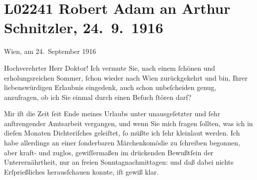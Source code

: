

\section[Robert Adam an Arthur Schnitzler, 24. 9. 1916]{L02241 Robert Adam an Arthur Schnitzler, 24. 9. 1916}
\nopagebreak{}
\rehead{ }\normalsize\beginnumbering{}
\toendnotes[C]{\smallbreak\pagebreak[2]}
\toendnotes[C]{\smallbreak}
\toendnotes[C]{\smallbreak}
\pstart
           \raggedleft{}{\pb}Wien, am 24. September 1916\pend
           
\pstart{}Hochverehrter Herr Doktor!\pend\vspace{0.5em}
\pstart
           Ich vermute Sie, nach einem{ }ſchönen und erholungsreichen Sommer,{ }ſchon wieder nach
                  Wien zurückgekehrt und bin, Ihrer
               liebenswürdigen Erlaubnis eingedenk, auch schon unbeſcheiden genug, anzufragen, ob
               ich Sie einmal durch einen Beſuch{ }ſtören darf?\pend
           
\pstart
           Mir iſt die Zeit{ }ſeit Ende meines Urlaubs unter unausgeſetzter und{ }ſehr anſtrengender
               Amtsarbeit vergangen, und wenn Sie mich fragen{ }ſollten, was ich in dieſen Monaten
               Dichteriſches geleiſtet,{ }ſo müßte ich{ }ſehr kleinlaut werden. Ich habe allerdings an
               einer {\pb}ſonderbaren Märchenkomödie zu{ }ſchreiben begonnen, aber kraft- und
               zuglos, gewiſſermaßen  im drückenden
               Bewußtſein der Unterernährtheit, nur an freien Sonntagnachmittagen: und daß dabei
               nichts Erſprießliches herausſchauen konnte, iſt gewiß klar.\pend
           
